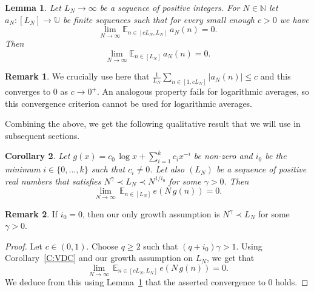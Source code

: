 \documentclass[11pt]{amsart}
\newtheorem{lemma}{Lemma}[section]
\newtheorem{corollary}[lemma]{Corollary}
\theoremstyle{definition}
\newtheorem*{remark}{Remark}
\newcommand{\E}{{\mathbb E}}
\newcommand{\N}{{\mathbb N}}
\newcommand{\U}{{\mathbb U}}
\begin{document}
 	\begin{lemma}\label{L:cN}
 		Let $L_N\to \infty$ be a sequence of positive integers. For $N\in\N$ let  $a_N\colon [L_N]\to \U$ be  finite sequences such that  for every  small enough $c>0$ we have
 		$$
 		\lim_{N\to\infty}  \E_{n\in [cL_N,L_N]} \ a_N(n)=0.
 		$$
 		Then
 		$$
 		\lim_{N\to\infty}\E_{n\in[L_N]} \, a_N(n)=0.
 		$$
 	\end{lemma}
 	\begin{remark}
 		We crucially  use here that $\frac{1}{L_N}\sum_{n\in [1,cL_N]}|a_N(n)|\leq c$ and this converges to $0$ as $c\to 0^+$.  An analogous property fails for logarithmic averages, so this convergence criterion cannot be used  for logarithmic averages.
 	\end{remark}
 	Combining the above,  we get the following qualitative result that we will use in subsequent sections.
 	\begin{corollary}\label{C:basicestimate}	
 		Let  $g(x)=c_0\, \log x +\sum_{i=1}^kc_i x^{-i}$ be non-zero
 		and $
 		i_0$ be the minimum   $i\in \{0,\ldots, k\}$ such that $c_i\neq 0$.
 		Let also   $(L_N)$ be a sequence of positive real numbers that satisfies $N^{\gamma}\prec L_N\prec N^{1/i_0} $ for some $\gamma>0$.
 		Then 	
 		$$
 		\lim_{N\to\infty} \, 	\E_{n\in [L_N]}\,  e(N\, g(n))=0.
 		$$
 	\end{corollary}
 \begin{remark}
 	If $i_0=0$, then  our only growth assumption is $N^{\gamma}\prec L_N$ for some $\gamma>0$.
 \end{remark}
 	\begin{proof}
 		Let $c\in (0,1)$. Choose $q\geq 2$ such that $(q+i_0)\gamma>1$.  Using Corollary~\ref{C:VDC} and our growth assumption on $L_N$, we get that
 		$$
 		\lim_{N\to\infty} \, 	\E_{n\in [cL_N,L_N]}\,  e(N\, g(n))=0.
 		$$
 		We deduce from this using Lemma~\ref{L:cN} that the asserted convergence to $0$ holds.
 	\end{proof}
 	
\end{document}
